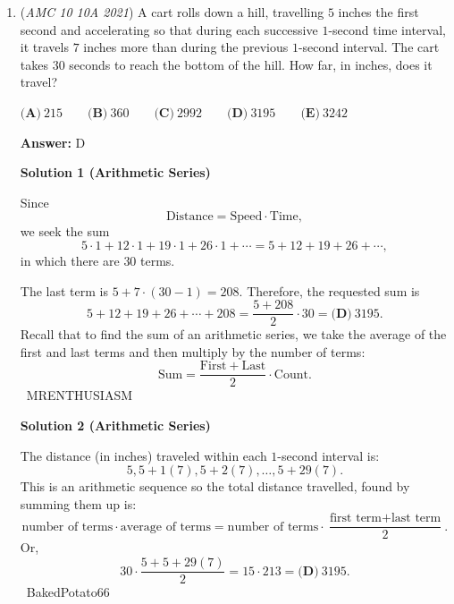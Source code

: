 \begin{enumerate}
\textbf{Solution 4 (Logic)}

We know that the larger number has a units digit of $0$ since it is divisible by 10. If $D$ is the ten's digit of the larger number, then $D$ is the units digit of the smaller number. Since the sum of the natural numbers has a unit's digit of $2$, $D=2$. 

 The units digit of the larger number is $0$ and the units digit of the smaller number is $2$, so the positive difference between the numbers is 8. There is only one answer choice that has this units digit, and that is $\boxed{\textbf{(D)} ~14{,}238}.$

 (Similar to MRENTHUSIASM's solution)

 


	\item (\textit{AMC 10 10A 2021}) A cart rolls down a hill, travelling $5$ inches the first second and accelerating so that during each successive $1$-second time interval, it travels $7$ inches more than during the previous $1$-second interval. The cart takes $30$ seconds to reach the bottom of the hill. How far, in inches, does it travel?


 $\textbf{(A)} ~215 \qquad\textbf{(B)} ~360\qquad\textbf{(C)} ~2992\qquad\textbf{(D)} ~3195\qquad\textbf{(E)} ~3242$

 \textbf{Answer: }D



\textbf{Solution 1 (Arithmetic Series)}

Since 
 \[\mathrm{Distance}=\mathrm{Speed}\cdot\mathrm{Time},\] we seek the sum 
 \[5\cdot1+12\cdot1+19\cdot1+26\cdot1+\cdots=5+12+19+26+\cdots,\] in which there are $30$ terms.

 The last term is $5+7\cdot(30-1)=208.$ Therefore, the requested sum is 
 \[5+12+19+26+\cdots+208=\frac{5+208}{2}\cdot30=\boxed{\textbf{(D)} ~3195}.\] Recall that to find the sum of an arithmetic series, we take the average of the first and last terms and then multiply by the number of terms: 
 \[\mathrm{Sum}=\frac{\mathrm{First}+\mathrm{Last}}{2}\cdot\mathrm{Count}.\] ~MRENTHUSIASM

 



\textbf{Solution 2 (Arithmetic Series)}

The distance (in inches) traveled within each $1$-second interval is: 
 \[5,5+1(7),5+2(7), \dots , 5+29(7).\]This is an arithmetic sequence so the total distance travelled, found by summing them up is:
 \[\text{number of terms} \cdot \text{average of terms} = \text{number of terms} \cdot \dfrac{\text{first term}+\text{last term}}{2}.\]Or, 
 \[30 \cdot \dfrac{5+5+29(7)}{2} = 15 \cdot 213 = \boxed{\textbf{(D)} ~3195}.\]~BakedPotato66


\end{enumerate}
